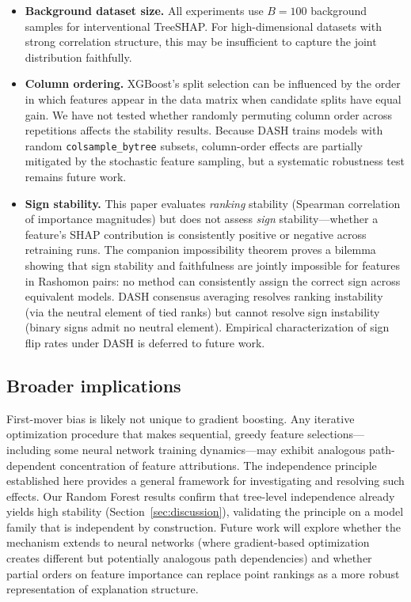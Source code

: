 \documentclass[11pt]{article}
\newcommand{\dash}{\textsc{DASH}}
\begin{document}
\begin{itemize}
    directly testing whether \dash{} over-equalizes.
  \item \textbf{Background dataset size.} All experiments use $B = 100$
    background samples for interventional TreeSHAP. For high-dimensional
    datasets with strong correlation structure, this may be insufficient
    to capture the joint distribution faithfully.
  \item \textbf{Column ordering.} XGBoost's split selection can be
    influenced by the order in which features appear in the data matrix
    when candidate splits have equal gain.  We have not tested whether
    randomly permuting column order across repetitions affects the
    stability results.  Because \dash{} trains models with random
    \texttt{colsample\_bytree} subsets, column-order effects are
    partially mitigated by the stochastic feature sampling, but a
    systematic robustness test remains future work.
  \item \textbf{Sign stability.} This paper evaluates \emph{ranking}
    stability (Spearman correlation of importance magnitudes) but does
    not assess \emph{sign} stability---whether a feature's SHAP
    contribution is consistently positive or negative across retraining
    runs.  The companion impossibility theorem
    \citep{caraker2026impossibility} proves a bilemma showing that sign
    stability and faithfulness are jointly impossible for features in
    Rashomon pairs: no method can consistently assign the correct sign
    across equivalent models.  \dash{} consensus averaging resolves
    ranking instability (via the neutral element of tied ranks) but
    cannot resolve sign instability (binary signs admit no neutral
    element).  Empirical characterization of sign flip rates under
    \dash{} is deferred to future work.
\end{itemize}

\subsection{Broader implications}

First-mover bias is likely not unique to gradient boosting. Any
iterative optimization procedure that makes sequential, greedy feature
selections---including some neural network training dynamics---may exhibit
analogous path-dependent concentration of feature attributions. The
independence principle established here provides a general framework for
investigating and resolving such effects. Our Random Forest results
confirm that tree-level independence already yields high stability
(Section~\ref{sec:discussion}), validating the principle on a model
family that is independent by construction. Future work will explore
whether the mechanism extends to neural networks (where gradient-based
optimization creates different but potentially analogous path
dependencies) and whether partial orders on feature importance can
replace point rankings as a more robust representation of explanation
structure.
\end{document}

